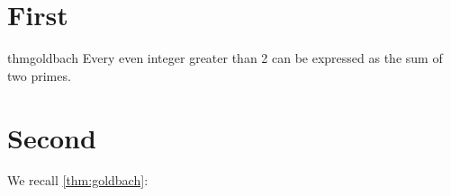 \documentclass{article}
\begin{document}
\section{First}

\begin{restatable}{thm}{goldbach} \label{thm:goldbach}
	Every even integer greater than 2 can be expressed as the sum of two primes.
\end{restatable}


\section{Second}

We recall \cref{thm:goldbach}:

\goldbach*
\end{document}
